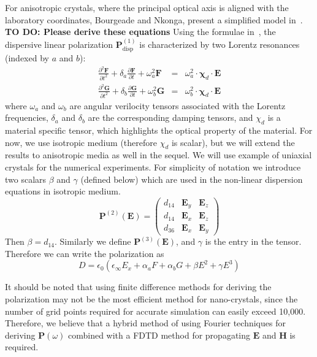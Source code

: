 \documentclass{article}[12pt]
\theoremstyle{plain}
\begin{document}
For anisotropic crystals, where the principal optical axis is aligned with the laboratory
coordinates, Bourgeade and Nkonga, present a simplified model in~\cite{bourgeade_and_nkonga_siam_2005}.
\textbf{TO DO: Please derive these equations}
Using the formulae in~\cite{bourgeade_and_nkonga_siam_2005}, the dispersive linear polarization
$\mathbf{P}^{(1)}_\mathrm{disp}$ is characterized by two Lorentz resonances (indexed by $a$ and $b$):
\begin{eqnarray}
\frac{\partial^2 \mathbf{F}}{\partial t^2} + \delta_a \frac{\partial \mathbf{F}}{\partial t} + 
\omega_a^2 \mathbf{F} & = & \omega^2_a\cdot\mathbf{\chi}_d\cdot\mathbf{E} \\
\frac{\partial^2 \mathbf{G}}{\partial t^2} + \delta_b \frac{\partial \mathbf{G}}{\partial t} + 
\omega_b^2 \mathbf{G} & = & \omega^2_b\cdot\mathbf{\chi}_d\cdot\mathbf{E}  \label{eqn:lorentz}
\end{eqnarray}
where $\omega_a$ and $\omega_b$ are angular verilocity tensors associated with the Lorentz frequencies,
$\delta_a$ and $\delta_b$ are the corresponding damping tensors, and $\chi_d$ is a material specific
tensor, which highlights the optical property of the material. 
For now, we use isotropic medium (therefore $\chi_d$ is scalar), 
but we will extend the results to anisotropic media as well
in the sequel.
We will use example of uniaxial
crystals for the numerical experiments.
For simplicity of notation we introduce two scalars $\beta$ and $\gamma$ (defined below)
which are used in the non-linear dispersion equations in isotropic medium.
\begin{equation}
\mathbf{P}^{(2)}(\mathbf{E}) = \begin{pmatrix} 
d_{14} & \mathbf{E}_y & \mathbf{E}_z \\
d_{14} & \mathbf{E}_x & \mathbf{E}_z \\
d_{36} & \mathbf{E}_x & \mathbf{E}_y 
\end{pmatrix}
\end{equation}
Then $\beta=d_{14}$.
Similarly we define $\mathbf{P}^{(3)}(\mathbf{E})$, and $\gamma$ is
the entry in the tensor. Therefore we can write the polarization as
\begin{equation}
D = \epsilon_0(\epsilon_\infty E_x + \alpha_a F + \alpha_b G + \beta E^2 + \gamma E^3) \label{eqn:main-polarization}
\end{equation}

It should be noted that using finite difference methods for deriving the polarization
may not be the most efficient method for nano-crystals, since the number of grid points
required for accurate simulation can easily exceed 10,000. Therefore, we believe that a hybrid
method of using Fourier techniques for deriving $\mathbf{P}(\omega)$ combined with a FDTD method
for propagating $\mathbf{E}$ and $\mathbf{H}$ is required.
\end{document}
